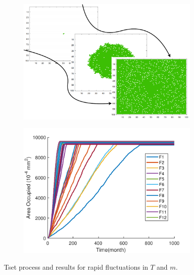 \documentclass{mcmthesis}
\begin{document}
\begin{figure}[H]
	\centering
	\begin{subfigure}{0.45\textwidth}
		\includegraphics[width=\textwidth]{./picture/SJflow.pdf}
	\end{subfigure}
	\begin{subfigure}{0.45\textwidth}
		\includegraphics[width=\textwidth]{./picture/12for5.pdf}
	\end{subfigure}
	\caption{Tset process and results for rapid fluctuations in $T$ and $m$.}
	\label{sjsjsj}
\end{figure}
\end{document}
